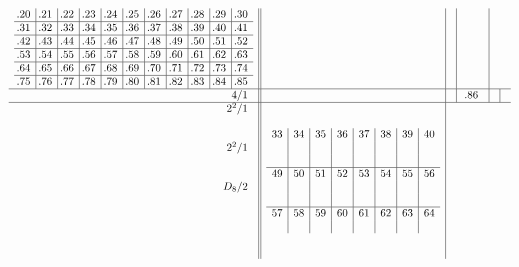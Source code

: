 \documentclass[11pt,a4paper]{amsart}
\begin{document}
\begin{align*}
\begin{array}{r||c|c|c|c|c}
\begin{array}{c|c|c|c|c|c|c|c|c|c|c}
\llap.20&\llap.21&\llap.22&\llap.23&\llap.24&\llap.25&\llap.26&\llap.27&\llap.28&\llap.29&\llap.30\\\hline
\llap.31&\llap.32&\llap.33&\llap.34&\llap.35&\llap.36&\llap.37&\llap.38&\llap.39&\llap.40&\llap.41\\\hline
\llap.42&\llap.43&\llap.44&\llap.45&\llap.46&\llap.47&\llap.48&\llap.49&\llap.50&\llap.51&\llap.52\\\hline
\llap.53&\llap.54&\llap.55&\llap.56&\llap.57&\llap.58&\llap.59&\llap.60&\llap.61&\llap.62&\llap.63\\\hline
\llap.64&\llap.65&\llap.66&\llap.67&\llap.68&\llap.69&\llap.70&\llap.71&\llap.72&\llap.73&\llap.74\\\hline
\llap.75&\llap.76&\llap.77&\llap.78&\llap.79&\llap.80&\llap.81&\llap.82&\llap.83&\llap.84&\llap.85\\
       \end{array}
&&&\\\hline
    \begin{array}{r}
      4/1 \\
    \end{array}
    &&&
        \begin{array}{c}
          \llap.86 \\
        \end{array}
&&\\ \hline
    \begin{array}{r}
      2^2/1 \\ \\ \\ 2^2/1 \\ \\ \\ D_8/2 \\ \\ \\ \\ \\ \\
    \end{array}
    &
  \begin{array}{c|c|c|c|c|c|c|c}
33&34&35&36&37&38&39&40\\
&&&&&&&\\
&&&&&&&\\\hline
49&50&51&52&53&54&55&56\\
&&&&&&&\\
&&&&&&&\\\hline
57&58&59&60&61&62&63&64\\
&&&&&&&\\

\end{array}
\end{array}
\end{align*}
\end{document}
